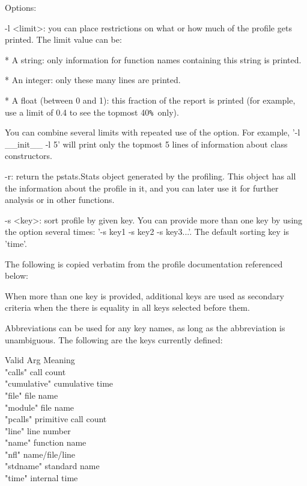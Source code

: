         Options:

        -l <limit>: you can place restrictions on what or how much of the
        profile gets printed. The limit value can be:

          * A string: only information for function names containing this string
          is printed.

          * An integer: only these many lines are printed.

          * A float (between 0 and 1): this fraction of the report is printed
          (for example, use a limit of 0.4 to see the topmost 40\texttt{\% }only).

        You can combine several limits with repeated use of the option. For
        example, '-l \_\_init\_\_ -l 5' will print only the topmost 5 lines of
        information about class constructors.

        -r: return the pstats.Stats object generated by the profiling. This
        object has all the information about the profile in it, and you can
        later use it for further analysis or in other functions.

       -s <key>: sort profile by given key. You can provide more than one key
        by using the option several times: '-s key1 -s key2 -s key3...'. The
        default sorting key is 'time'.

        The following is copied verbatim from the profile documentation
        referenced below:

        When more than one key is provided, additional keys are used as
        secondary criteria when the there is equality in all keys selected
        before them.
        
        Abbreviations can be used for any key names, as long as the
        abbreviation is unambiguous.  The following are the keys currently
        defined:

                Valid Arg       Meaning\\
                  "calls"      call count\\
                  "cumulative" cumulative time\\
                  "file"       file name\\
                  "module"     file name\\
                  "pcalls"     primitive call count\\
                  "line"       line number\\
                  "name"       function name\\
                  "nfl"        name/file/line\\
                  "stdname"    standard name\\
                  "time"       internal time

